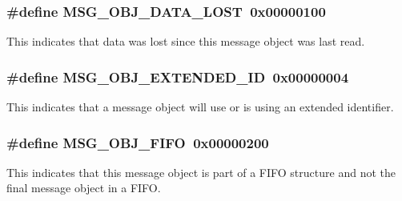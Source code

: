 \subsubsection[{\texorpdfstring{M\+S\+G\+\_\+\+O\+B\+J\+\_\+\+D\+A\+T\+A\+\_\+\+L\+O\+ST}{MSG_OBJ_DATA_LOST}}]{\setlength{\rightskip}{0pt plus 5cm}\#define M\+S\+G\+\_\+\+O\+B\+J\+\_\+\+D\+A\+T\+A\+\_\+\+L\+O\+ST~0x00000100}\hypertarget{group__can__api_ga6405afc8e3cc146889ea8bc32bd0f0ca}{}\label{group__can__api_ga6405afc8e3cc146889ea8bc32bd0f0ca}
This indicates that data was lost since this message object was last read. 
\subsubsection[{\texorpdfstring{M\+S\+G\+\_\+\+O\+B\+J\+\_\+\+E\+X\+T\+E\+N\+D\+E\+D\+\_\+\+ID}{MSG_OBJ_EXTENDED_ID}}]{\setlength{\rightskip}{0pt plus 5cm}\#define M\+S\+G\+\_\+\+O\+B\+J\+\_\+\+E\+X\+T\+E\+N\+D\+E\+D\+\_\+\+ID~0x00000004}\hypertarget{group__can__api_ga9387d98cd6262e0be419aceab45295e4}{}\label{group__can__api_ga9387d98cd6262e0be419aceab45295e4}
This indicates that a message object will use or is using an extended identifier. 
\subsubsection[{\texorpdfstring{M\+S\+G\+\_\+\+O\+B\+J\+\_\+\+F\+I\+FO}{MSG_OBJ_FIFO}}]{\setlength{\rightskip}{0pt plus 5cm}\#define M\+S\+G\+\_\+\+O\+B\+J\+\_\+\+F\+I\+FO~0x00000200}\hypertarget{group__can__api_ga5e3141ec2c5c1130f5c8c0601ce9e614}{}\label{group__can__api_ga5e3141ec2c5c1130f5c8c0601ce9e614}
This indicates that this message object is part of a F\+I\+FO structure and not the final message object in a F\+I\+FO. 
